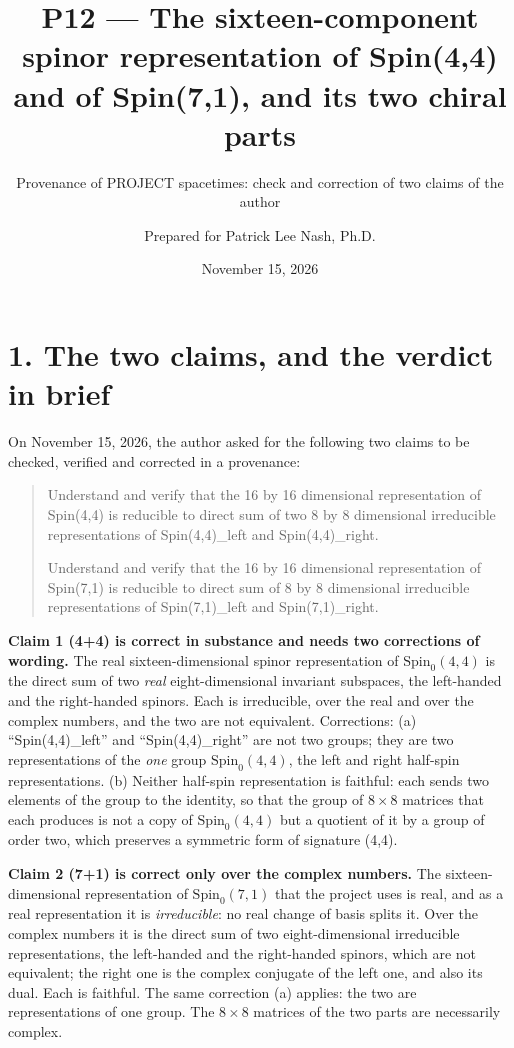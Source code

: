 \documentclass[
  10pt,
]{article}
\title{P12 --- The sixteen-component spinor representation of Spin(4,4)
and of Spin(7,1), and its two chiral parts}
\subtitle{Provenance of PROJECT spacetimes: check and correction of two
claims of the author}
\author{Prepared for Patrick Lee Nash, Ph.D.}
\date{November 15, 2026}
\begin{document}
\maketitle

\hypertarget{the-two-claims-and-the-verdict-in-brief}{%
\section{1. The two claims, and the verdict in
brief}\label{the-two-claims-and-the-verdict-in-brief}}

On November 15, 2026, the author asked for the following two claims to
be checked, verified and corrected in a provenance:

\begin{quote}
Understand and verify that the 16 by 16 dimensional representation of
Spin(4,4) is reducible to direct sum of two 8 by 8 dimensional
irreducible representations of Spin(4,4)\_left and Spin(4,4)\_right.

Understand and verify that the 16 by 16 dimensional representation of
Spin(7,1) is reducible to direct sum of 8 by 8 dimensional irreducible
representations of Spin(7,1)\_left and Spin(7,1)\_right.
\end{quote}

\textbf{Claim 1 (4+4) is correct in substance and needs two corrections
of wording.} The real sixteen-dimensional spinor representation of
\(\mathrm{Spin}_0(4,4)\) is the direct sum of two \emph{real}
eight-dimensional invariant subspaces, the left-handed and the
right-handed spinors. Each is irreducible, over the real and over the
complex numbers, and the two are not equivalent. Corrections: (a)
``Spin(4,4)\_left'' and ``Spin(4,4)\_right'' are not two groups; they
are two representations of the \emph{one} group
\(\mathrm{Spin}_0(4,4)\), the left and right half-spin representations.
(b) Neither half-spin representation is faithful: each sends two
elements of the group to the identity, so that the group of \(8\times8\)
matrices that each produces is not a copy of \(\mathrm{Spin}_0(4,4)\)
but a quotient of it by a group of order two, which preserves a
symmetric form of signature (4,4).

\textbf{Claim 2 (7+1) is correct only over the complex numbers.} The
sixteen-dimensional representation of \(\mathrm{Spin}_0(7,1)\) that the
project uses is real, and as a real representation it is
\emph{irreducible}: no real change of basis splits it. Over the complex
numbers it is the direct sum of two eight-dimensional irreducible
representations, the left-handed and the right-handed spinors, which are
not equivalent; the right one is the complex conjugate of the left one,
and also its dual. Each is faithful. The same correction (a) applies:
the two are representations of one group. The \(8\times8\) matrices of
the two parts are necessarily complex.
\end{document}
